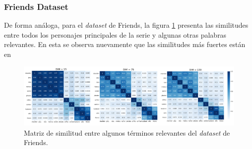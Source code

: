 \subsubsection{Friends Dataset}

De forma análoga, para el \textit{dataset} de Friends, la figura \ref{fig:friends_sim_matrix} presenta las similitudes entre todos los personajes principales de la serie y algunas otras palabras relevantes. En esta se observa nuevamente que las similitudes más fuertes están en 

\begin{figure}[H]
    \centering
    \includegraphics[width=\textwidth]{doc/images/friends_sim_matrix.png}
    \caption{Matriz de similitud entre algunos términos relevantes del \textit{dataset} de Friends.}
    \label{fig:friends_sim_matrix}
\end{figure}

\newpage